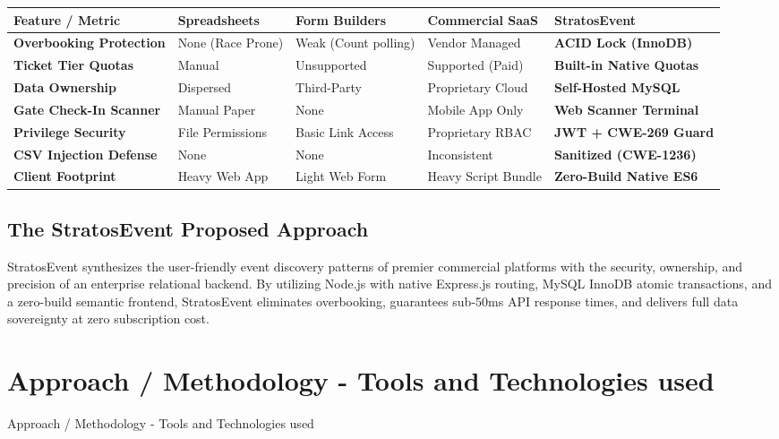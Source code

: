 \documentclass[11pt,a4paper]{article}
\begin{document}
\noindent
\begin{tabularx}{\textwidth}{|p{}|X|X|X|X|}
\hline
\rowcolor{TCSBlue}
\color{white}\bfseries Feature / Metric & 
\color{white}\bfseries Spreadsheets & 
\color{white}\bfseries Form Builders & 
\color{white}\bfseries Commercial SaaS & 
\color{white}\bfseries StratosEvent \\
\hline
\textbf{Overbooking Protection} & None (Race Prone) & Weak (Count polling) & Vendor Managed & \textbf{ACID Lock (InnoDB)} \\
\hline
\textbf{Ticket Tier Quotas} & Manual & Unsupported & Supported (Paid) & \textbf{Built-in Native Quotas} \\
\hline
\textbf{Data Ownership} & Dispersed & Third-Party & Proprietary Cloud & \textbf{Self-Hosted MySQL} \\
\hline
\textbf{Gate Check-In Scanner} & Manual Paper & None & Mobile App Only & \textbf{Web Scanner Terminal} \\
\hline
\textbf{Privilege Security} & File Permissions & Basic Link Access & Proprietary RBAC & \textbf{JWT + CWE-269 Guard} \\
\hline
\textbf{CSV Injection Defense} & None & None & Inconsistent & \textbf{Sanitized (CWE-1236)} \\
\hline
\textbf{Client Footprint} & Heavy Web App & Light Web Form & Heavy Script Bundle & \textbf{Zero-Build Native ES6} \\
\hline
\end{tabularx}
\endgroup

\vspace{0.15in}
\subsection*{The StratosEvent Proposed Approach}
\justifying

StratosEvent synthesizes the user-friendly event discovery patterns of premier commercial platforms with the security, ownership, and precision of an enterprise relational backend. By utilizing Node.js with native Express.js routing, MySQL InnoDB atomic transactions, and a zero-build semantic frontend, StratosEvent eliminates overbooking, guarantees sub-50ms API response times, and delivers full data sovereignty at zero subscription cost.

\newpage
\section*{{\color{TitleBlue}\bfseries
\fontsize{18}{22}\selectfont
Approach / Methodology - Tools and Technologies used}}
{Approach / Methodology - Tools and Technologies used}
\end{document}

